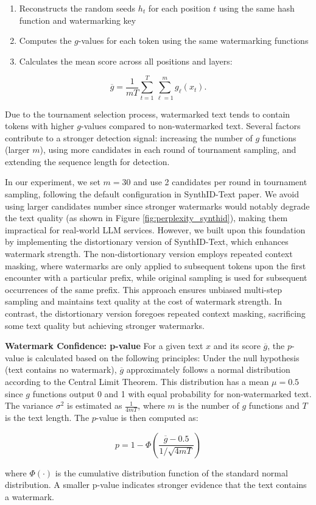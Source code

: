 \begin{enumerate}
\item Reconstructs the random seeds $h_t$ for each position $t$ using the same hash function and watermarking key
\item Computes the $g$-values for each token using the same watermarking functions  
\item Calculates the mean score across all positions and layers:
\end{enumerate}

\begin{equation}
\overline{g} = \frac{1}{mT} \sum_{t=1}^T \sum_{\ell=1}^m g_\ell(x_t).
\end{equation}

Due to the tournament selection process, watermarked text tends to contain tokens with higher $g$-values compared to non-watermarked text. Several factors contribute to a stronger detection signal: increasing the number of $g$ functions (larger $m$), using more candidates in each round of tournament sampling, and extending the sequence length for detection.

In our experiment, we set $m=30$ and use 2 candidates per round in tournament sampling, following the default configuration in SynthID-Text paper. We avoid using larger candidates number since stronger watermarks would notably degrade the text quality (as shown in Figure \ref{fig:perplexity_synthid}), making them impractical for real-world LLM services. However, we built upon this foundation by implementing the distortionary version of SynthID-Text, which enhances watermark strength. The non-distortionary version employs repeated context masking, where watermarks are only applied to subsequent tokens upon the first encounter with a particular prefix, while original sampling is used for subsequent occurrences of the same prefix. This approach ensures unbiased multi-step sampling and maintains text quality at the cost of watermark strength. In contrast, the distortionary version foregoes repeated context masking, sacrificing some text quality but achieving stronger watermarks.

\vspace{3pt}

\noindent\textbf{Watermark Confidence: p-value} \quad For a given text $x$ and its score $\overline{g}$, the $p$-value is calculated based on the following principles: Under the null hypothesis (text contains no watermark), $\overline{g}$ approximately follows a normal distribution according to the Central Limit Theorem. This distribution has a mean $\mu = 0.5$ since $g$ functions output 0 and 1 with equal probability for non-watermarked text. The variance $\sigma^2$ is estimated as $\frac{1}{4mT}$, where $m$ is the number of $g$ functions and $T$ is the text length. The $p$-value is then computed as:

\begin{equation}
p = 1 - \Phi(\frac{\overline{g} - 0.5}{1/\sqrt{4mT}})
\end{equation}

where $\Phi(\cdot)$ is the cumulative distribution function of the standard normal distribution. A smaller p-value indicates stronger evidence that the text contains a watermark.